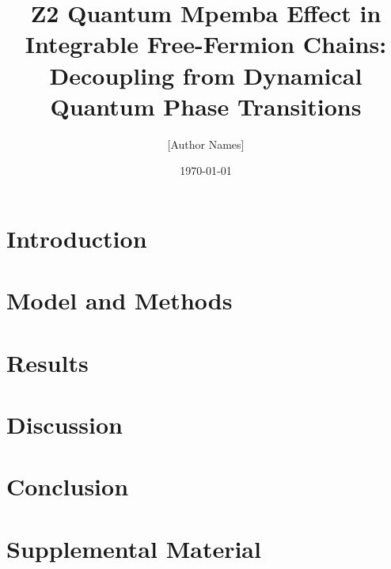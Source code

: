 \documentclass[a4paper,11pt]{article}
\title{Z2 Quantum Mpemba Effect in Integrable Free-Fermion Chains:\\
Decoupling from Dynamical Quantum Phase Transitions}
\author{[Author Names]}
\date{\today}
\begin{document}
\maketitle
\begin{abstract}\end{abstract}
\section{Introduction}
\section{Model and Methods}
\section{Results}
\section{Discussion}
\section{Conclusion}
\appendix
\section*{Supplemental Material}


\end{document}
